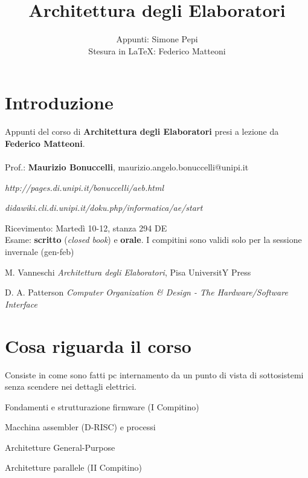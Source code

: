 \documentclass[10pt]{report}
\begin{document}
\title{Architettura degli Elaboratori}
\author{Appunti: Simone Pepi\\Stesura in \LaTeX: Federico Matteoni}
\date{ }
\renewcommand*\contentsname{Indice}

\maketitle
\begin{multicols}{2}
\tableofcontents
\end{multicols}
\pagebreak
\section{Introduzione}
Appunti del corso di \textbf{Architettura degli Elaboratori} presi a lezione da \textbf{Federico Matteoni}.\\\\
Prof.: \textbf{Maurizio Bonuccelli}, maurizio.angelo.bonuccelli@unipi.it\\
\begin{list}{-}{Riferimenti web:}
\item \emph{http://pages.di.unipi.it/bonuccelli/aeb.html}
\item \emph{didawiki.cli.di.unipi.it/doku.php/informatica/ae/start}
\end{list}
Ricevimento: Martedì 10-12, stanza 294 DE\\
Esame: \textbf{scritto} (\textit{closed book}) e \textbf{orale}. I compitini sono validi solo per la sessione invernale (gen-feb)\\
\begin{list}{-}{Libri}
\item  M. Vanneschi \textit{Architettura degli Elaboratori}, Pisa UniversitY Press
\item D. A. Patterson \textit{Computer Organization \& Design - The Hardware/Software Interface}
\end{list}
\section{Cosa riguarda il corso}
Consiste in come sono fatti pc internamento da un punto di vista di sottosistemi senza scendere nei dettagli elettrici.
\begin{list}{-}{Il corso è diviso in quattro parti:}
\item Fondamenti e strutturazione firmware (I Compitino)
\item Macchina assembler (D-RISC) e processi
\item Architetture General-Purpose
\item Architetture parallele (II Compitino)
\end{list}
\end{document}
